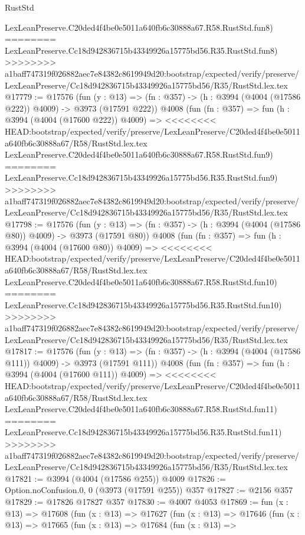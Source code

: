 \begin{lexlean}{RustStd}
\begin{coremodule}
{\begin{coremodule}
{{{{{{{{{{{{{{{{    LexLeanPreserve.C20ded4f4be0e5011a640fb6c30888a67.R58.RustStd.fun8)
========
    LexLeanPreserve.Cc18d942836715b43349926a15775bd56.R35.RustStd.fun8)
>>>>>>>> a1baff747319f026882aec7e84382c8619949d20:bootstrap/expected/verify/preserve/LexLeanPreserve/Cc18d942836715b43349926a15775bd56/R35/RustStd.lex.tex
@17779 := @17576
    (fun (y : @13) => (fn : @357) -> (h : @3994 (@4004 (@17586 @222)) @4009) -> @3973 (@17591 @222))
    @4008
    (fun (fn : @357) =>
    fun (h : @3994 (@4004 (@17600 @222)) @4009) =>
<<<<<<<< HEAD:bootstrap/expected/verify/preserve/LexLeanPreserve/C20ded4f4be0e5011a640fb6c30888a67/R58/RustStd.lex.tex
    LexLeanPreserve.C20ded4f4be0e5011a640fb6c30888a67.R58.RustStd.fun9)
========
    LexLeanPreserve.Cc18d942836715b43349926a15775bd56.R35.RustStd.fun9)
>>>>>>>> a1baff747319f026882aec7e84382c8619949d20:bootstrap/expected/verify/preserve/LexLeanPreserve/Cc18d942836715b43349926a15775bd56/R35/RustStd.lex.tex
@17798 := @17576
    (fun (y : @13) => (fn : @357) -> (h : @3994 (@4004 (@17586 @80)) @4009) -> @3973 (@17591 @80))
    @4008
    (fun (fn : @357) =>
    fun (h : @3994 (@4004 (@17600 @80)) @4009) =>
<<<<<<<< HEAD:bootstrap/expected/verify/preserve/LexLeanPreserve/C20ded4f4be0e5011a640fb6c30888a67/R58/RustStd.lex.tex
    LexLeanPreserve.C20ded4f4be0e5011a640fb6c30888a67.R58.RustStd.fun10)
========
    LexLeanPreserve.Cc18d942836715b43349926a15775bd56.R35.RustStd.fun10)
>>>>>>>> a1baff747319f026882aec7e84382c8619949d20:bootstrap/expected/verify/preserve/LexLeanPreserve/Cc18d942836715b43349926a15775bd56/R35/RustStd.lex.tex
@17817 := @17576
    (fun (y : @13) => (fn : @357) -> (h : @3994 (@4004 (@17586 @111)) @4009) -> @3973 (@17591 @111))
    @4008
    (fun (fn : @357) =>
    fun (h : @3994 (@4004 (@17600 @111)) @4009) =>
<<<<<<<< HEAD:bootstrap/expected/verify/preserve/LexLeanPreserve/C20ded4f4be0e5011a640fb6c30888a67/R58/RustStd.lex.tex
    LexLeanPreserve.C20ded4f4be0e5011a640fb6c30888a67.R58.RustStd.fun11)
========
    LexLeanPreserve.Cc18d942836715b43349926a15775bd56.R35.RustStd.fun11)
>>>>>>>> a1baff747319f026882aec7e84382c8619949d20:bootstrap/expected/verify/preserve/LexLeanPreserve/Cc18d942836715b43349926a15775bd56/R35/RustStd.lex.tex
@17821 := @3994 (@4004 (@17586 @255)) @4009
@17826 := Option.noConfusion.{0, 0} (@3973 (@17591 @255)) @357
@17827 := @2156 @357
@17829 := @17826 @17827 @357
@17830 := @4007 @4053
@17869 := fun (x : @13) =>
  @17608
    (fun (x : @13) =>
    @17627
      (fun (x : @13) =>
      @17646
        (fun (x : @13) =>
        @17665
          (fun (x : @13) =>
          @17684
            (fun (x : @13) =>
}}}}}}}}}}}}}}}}
\end{coremodule}}
\end{coremodule}
\end{lexlean}
